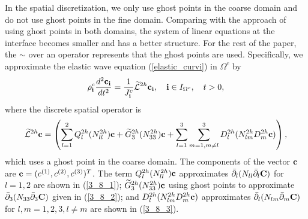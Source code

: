     
In the spatial discretization, we only use ghost points in the coarse domain and do not use ghost points in the fine domain. Comparing with the approach of using ghost points in both domains, the system of linear equations at the interface becomes smaller and has a better structure. For the rest of the paper, the $\sim$ over an operator represents that the ghost points are used. Specifically, we approximate the elastic wave equation (\ref{elastic_curvi}) in $\Omega^c$ by
\begin{equation}\label{elastic_semi_c}
{\rho}_{\bf i}^{c}\frac{d^2{{\bf c}_{\bf i}}}{dt^2} = \frac{1}{J^c_{\bf i}}\wt{\mathcal{L}}^{2h} {{\bf c}}_{\bf i},\quad {\bf i}\in I_{\Omega^c},\quad t>0,
\end{equation}
where the discrete spatial operator is
\begin{equation}\label{L_operator}
\wt{\mathcal{L}}^{2h} {{\bf c}} = \left(\sum_{l=1}^2{Q}_l^{2h}({N}_{ll}^{2h}){\bf c}+\wt{{G}}_3^{2h}({N}_{33}^{2h}){{\bf c}}+\sum_{l=1}^3\sum_{m=1,m\neq l}^3{D}_l^{2h}({N}_{lm}^{2h}{D}_m^{2h}{\bf c})\right),
\end{equation}
{\color{red} which uses a ghost point in the coarse domain. The components of the vector ${\bf c}$ are ${\bf c} = (c^{(1)}, c^{(2)}, c^{(3)})^T$. The term $Q_l^{2h}(N_{ll}^{2h}){\bf c}$ approximates $\bar{\partial}_l(N_{ll}\bar{\partial}_l{\bf C})$ for $ l = 1,2$ are shown in (\ref{3_8_1}); $\widetilde{G}_3^{2h}(N_{33}^{2h}){\bf c}$ using ghost points to approximate $\bar{\partial}_3(N_{33}\bar{\partial}_3 {\bf C})$ given in (\ref{3_8_2}); and $D_{l}^{2h}(N_{lm}^{2h}D_m^{2h}{\bf c})$ approximates $\bar{\partial}_l(N_{lm}\bar{\partial}_m {\bf C})$ for  $l,m = 1,2,3, l\neq m$ are shown in (\ref{3_8_3}).}

